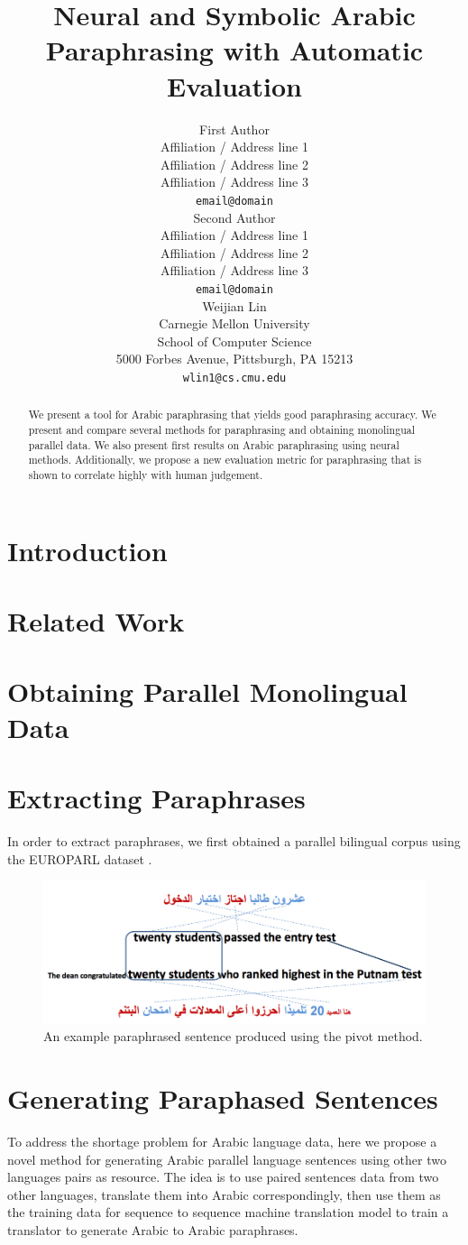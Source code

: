 \documentclass[11pt,letterpaper]{article}
\title{Neural and Symbolic Arabic Paraphrasing with Automatic Evaluation}
\author{First Author \\
  Affiliation / Address line 1 \\
  Affiliation / Address line 2 \\
  Affiliation / Address line 3 \\
  {\tt email@domain} \\\And
  Second Author \\
  Affiliation / Address line 1 \\
  Affiliation / Address line 2 \\
  Affiliation / Address line 3 \\
  {\tt email@domain} \\\And
  Weijian Lin \\
 Carnegie Mellon University\\
 School of Computer Science \\ 
 5000 Forbes Avenue, Pittsburgh, PA 15213 \\
  {\tt wlin1@cs.cmu.edu} \\}
\date{}
\begin{document}
\maketitle
\begin{abstract}

	We present a tool for Arabic paraphrasing that yields good paraphrasing accuracy.  We present and compare several methods for paraphrasing and obtaining monolingual parallel data. We also present first results on Arabic paraphrasing using neural methods. Additionally, we propose a new evaluation metric for paraphrasing that is shown to correlate highly with human judgement.
\end{abstract}


\section{Introduction}

\section{Related Work}

\section{Obtaining Parallel Monolingual Data}

\section{Extracting Paraphrases}
In order to extract paraphrases, we first obtained a parallel bilingual corpus using the EUROPARL dataset \cite{Koehn_europarl}. \cite{bannard2005bilingual}
\begin{figure}
\includegraphics[scale=0.5]{arabic_pivot}
\caption{An example paraphrased sentence produced using the pivot method. }
\end{figure}
\section{Generating Paraphased Sentences}
	To address the shortage problem for Arabic language data, here we propose a novel method for generating Arabic parallel language sentences using other two languages pairs as resource. The idea is to use paired sentences data from two other languages, translate them into Arabic correspondingly, then use them as the  training data for sequence to sequence machine translation model to train a translator  to generate Arabic to Arabic paraphrases.
  
\end{document}
